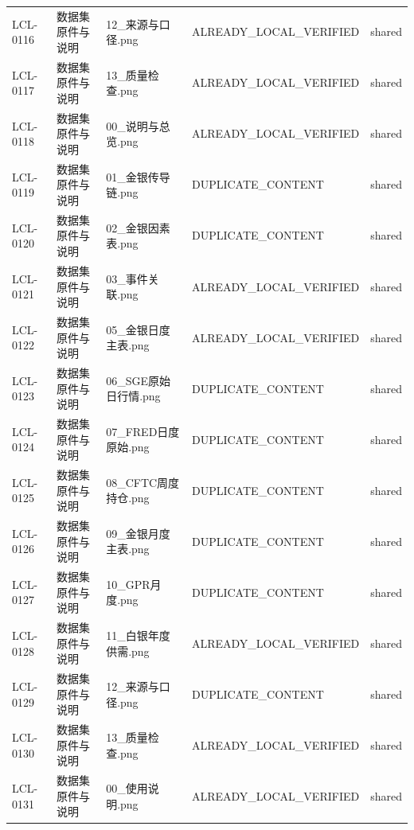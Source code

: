 \documentclass[UTF8,openany,oneside,11pt]{ctexbook}
\begin{document}
\begin{longtable}{L{1.4cm}L{2.4cm}L{6.0cm}L{3.0cm}L{1.8cm}}
LCL-\allowbreak{}0116 & 数据集原件与说明 & 12\_\allowbreak{}来源与口径.png & ALREADY\_\allowbreak{}LOCAL\_\allowbreak{}VERIFIED & shared \\
LCL-\allowbreak{}0117 & 数据集原件与说明 & 13\_\allowbreak{}质量检查.png & ALREADY\_\allowbreak{}LOCAL\_\allowbreak{}VERIFIED & shared \\
LCL-\allowbreak{}0118 & 数据集原件与说明 & 00\_\allowbreak{}说明与总览.png & ALREADY\_\allowbreak{}LOCAL\_\allowbreak{}VERIFIED & shared \\
LCL-\allowbreak{}0119 & 数据集原件与说明 & 01\_\allowbreak{}金银传导链.png & DUPLICATE\_\allowbreak{}CONTENT & shared \\
LCL-\allowbreak{}0120 & 数据集原件与说明 & 02\_\allowbreak{}金银因素表.png & DUPLICATE\_\allowbreak{}CONTENT & shared \\
LCL-\allowbreak{}0121 & 数据集原件与说明 & 03\_\allowbreak{}事件关联.png & ALREADY\_\allowbreak{}LOCAL\_\allowbreak{}VERIFIED & shared \\
LCL-\allowbreak{}0122 & 数据集原件与说明 & 05\_\allowbreak{}金银日度主表.png & ALREADY\_\allowbreak{}LOCAL\_\allowbreak{}VERIFIED & shared \\
LCL-\allowbreak{}0123 & 数据集原件与说明 & 06\_\allowbreak{}SGE原始日行情.png & DUPLICATE\_\allowbreak{}CONTENT & shared \\
LCL-\allowbreak{}0124 & 数据集原件与说明 & 07\_\allowbreak{}FRED日度原始.png & DUPLICATE\_\allowbreak{}CONTENT & shared \\
LCL-\allowbreak{}0125 & 数据集原件与说明 & 08\_\allowbreak{}CFTC周度持仓.png & DUPLICATE\_\allowbreak{}CONTENT & shared \\
LCL-\allowbreak{}0126 & 数据集原件与说明 & 09\_\allowbreak{}金银月度主表.png & DUPLICATE\_\allowbreak{}CONTENT & shared \\
LCL-\allowbreak{}0127 & 数据集原件与说明 & 10\_\allowbreak{}GPR月度.png & DUPLICATE\_\allowbreak{}CONTENT & shared \\
LCL-\allowbreak{}0128 & 数据集原件与说明 & 11\_\allowbreak{}白银年度供需.png & ALREADY\_\allowbreak{}LOCAL\_\allowbreak{}VERIFIED & shared \\
LCL-\allowbreak{}0129 & 数据集原件与说明 & 12\_\allowbreak{}来源与口径.png & DUPLICATE\_\allowbreak{}CONTENT & shared \\
LCL-\allowbreak{}0130 & 数据集原件与说明 & 13\_\allowbreak{}质量检查.png & ALREADY\_\allowbreak{}LOCAL\_\allowbreak{}VERIFIED & shared \\
LCL-\allowbreak{}0131 & 数据集原件与说明 & 00\_\allowbreak{}使用说明.png & ALREADY\_\allowbreak{}LOCAL\_\allowbreak{}VERIFIED & shared \\

\end{longtable}
\end{document}
